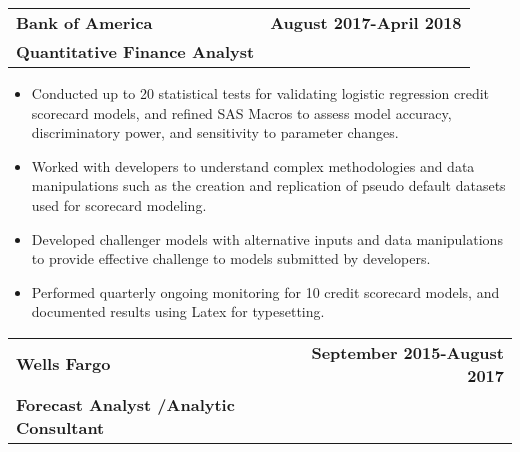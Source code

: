 \documentclass[a4paper,10pt]{article}
\begin{document}
\noindent
\begin{tabular}{p{} r}
   \textbf{Bank of America} & \textbf{August 2017-April 2018}\\
    \textbf{Quantitative Finance Analyst} & \\    
\end{tabular}
\begin{itemize}
\item Conducted up to 20 statistical tests for validating logistic regression credit scorecard models, and refined SAS Macros to assess model accuracy, discriminatory power, and sensitivity to parameter changes.
\item Worked with developers to understand complex methodologies and data manipulations such as the creation and replication of pseudo default datasets used for scorecard modeling.
\item Developed challenger models with alternative inputs and data manipulations to provide effective challenge to models submitted by developers.
\item Performed quarterly ongoing monitoring for 10 credit scorecard models, and documented results using Latex for typesetting.
\end{itemize}

\noindent
\begin{tabular}{p{} r}
   \textbf{Wells Fargo} & \textbf{September 2015-August 2017}\\
    \textbf{Forecast Analyst /Analytic Consultant} & \\    
\end{tabular}
\end{document}
